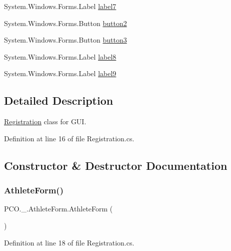 \begin{DoxyCompactItemize}
\item 
System.\+Windows.\+Forms.\+Label \hyperlink{classPCO_1_1__0_1_1AthleteForm_ae3cc01074736dd8511ca37fbd2ac55e4}{label7}
\item 
System.\+Windows.\+Forms.\+Button \hyperlink{classPCO_1_1__0_1_1AthleteForm_a7c8166ff30baadd6cb0c281cd8308e30}{button2}
\item 
System.\+Windows.\+Forms.\+Button \hyperlink{classPCO_1_1__0_1_1AthleteForm_a6dc6a58f8577a62db3b3b767ddcb5b04}{button3}
\item 
System.\+Windows.\+Forms.\+Label \hyperlink{classPCO_1_1__0_1_1AthleteForm_a1813ffa0b4fd481ad8934a606ed413d6}{label8}
\item 
System.\+Windows.\+Forms.\+Label \hyperlink{classPCO_1_1__0_1_1AthleteForm_ad04e7a32bf0bd1ea170cd962becc8c94}{label9}
\end{DoxyCompactItemize}


\subsection{Detailed Description}
\hyperlink{classRegistration}{Registration} class for G\+UI. 

Definition at line 16 of file Registration.\+cs.



\subsection{Constructor \& Destructor Documentation}
\mbox{\label{classPCO_1_1__0_1_1AthleteForm_a3a129c00c114ef80d97231dfa01e2d6f}} 
\subsubsection{\texorpdfstring{Athlete\+Form()}{AthleteForm()}}
{\footnotesize\ttfamily P\+C\+O.\+\_.\+Athlete\+Form.\+Athlete\+Form (\begin{DoxyParamCaption}{ }\end{DoxyParamCaption})\hspace{0.3cm}{\ttfamily [inline]}}



Definition at line 18 of file Registration.\+cs.



